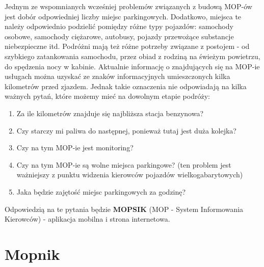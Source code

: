 Jednym ze wspomnianych wcześniej problemów związanych z budową MOP-ów jest dobór odpowiedniej liczby miejsc parkingowych. Dodatkowo, miejsca te należy odpowiednio podzielić pomiędzy różne typy pojazdów: samochody osobowe, samochody ciężarowe, autobusy, pojazdy przewożące substancje niebezpieczne itd. Podróżni mają też różne potrzeby związane z postojem - od szybkiego zatankowania samochodu, przez obiad z rodziną na świeżym powietrzu, do spędzenia nocy w kabinie. \newline Aktualnie informację o znajdujących się na MOP-ie usługach można uzyskać ze znaków informacyjnych umieszczonych kilka kilometrów przed zjazdem. Jednak takie oznaczenia nie odpowiadają na kilka ważnych pytań, które możemy mieć na dowolnym etapie podróży:
\begin{enumerate}
	\item Za ile kilometrów znajduje się najbliższa stacja benzynowa? 
	\item Czy starczy mi paliwa do następnej, ponieważ tutaj jest duża kolejka?
	\item Czy na tym MOP-ie jest monitoring?
	\item Czy na tym MOP-ie są wolne miejsca parkingowe? (ten problem jest ważniejszy z punktu widzenia kierowców pojazdów wielkogabarytowych)
	\item Jaka będzie zajętość miejsc parkingowych za godzinę?
\end{enumerate}

Odpowiedzią na te pytania będzie \textbf{MOPSIK} (MOP - System Informowania Kierowców) - aplikacja mobilna i strona internetowa.

\chapter{Mopnik}\label{r:mopnik}


